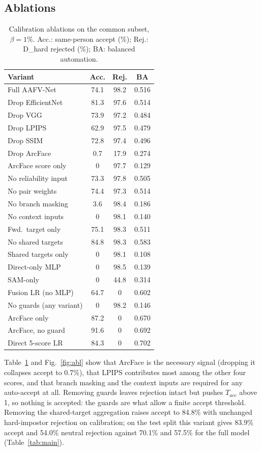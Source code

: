 \documentclass[10pt,twocolumn]{article}
\newcommand{\sys}{AAFV-Net}
\begin{document}
\subsection{Ablations}
\begin{table}[t]
\centering\small
\caption{Calibration ablations on the common subset, $\beta=1\%$. Acc.: same-person accept (\%); Rej.: D\_hard rejected (\%); BA: balanced automation.}
\label{tab:abl}
\setlength{\tabcolsep}{3pt}
\begin{tabular}{@{}lccc@{}}
\toprule
Variant & Acc. & Rej. & BA\\\midrule
Full \sys & 74.1 & 98.2 & 0.516\\
Drop EfficientNet & 81.3 & 97.6 & 0.514\\
Drop VGG & 73.9 & 97.2 & 0.484\\
Drop LPIPS & 62.9 & 97.5 & 0.479\\
Drop SSIM & 72.8 & 97.4 & 0.496\\
Drop ArcFace & 0.7 & 17.9 & 0.274\\
ArcFace score only & 0 & 97.7 & 0.129\\
No reliability input & 73.3 & 97.8 & 0.505\\
No pair weights & 74.4 & 97.3 & 0.514\\
No branch masking & 3.6 & 98.4 & 0.186\\
No context inputs & 0 & 98.1 & 0.140\\
Fwd.\ target only & 75.1 & 98.3 & 0.511\\
No shared targets & 84.8 & 98.3 & 0.583\\
Shared targets only & 0 & 98.1 & 0.108\\
Direct-only MLP & 0 & 98.5 & 0.139\\
SAM-only & 0 & 44.8 & 0.314\\
Fusion LR (no MLP) & 64.7 & 0 & 0.602\\
No guards (any variant) & 0 & 98.2 & 0.146\\
ArcFace only & 87.2 & 0 & 0.670\\
ArcFace, no guard & 91.6 & 0 & 0.692\\
Direct 5-score LR & 84.3 & 0 & 0.702\\\bottomrule
\end{tabular}
\end{table}
Table~\ref{tab:abl} and Fig.~\ref{fig:abl} show that ArcFace is the necessary signal (dropping it collapses accept to 0.7\%), that LPIPS contributes most among the other four scores, and that branch masking and the context inputs are required for any auto-accept at all. Removing guards leaves rejection intact but pushes $T_{acc}$ above 1, so nothing is accepted: the guards are what allow a finite accept threshold. Removing the shared-target aggregation raises accept to 84.8\% with unchanged hard-impostor rejection on calibration; on the test split this variant gives 83.9\% accept and 54.0\% neutral rejection against 70.1\% and 57.5\% for the full model (Table~\ref{tab:main}).
\end{document}
